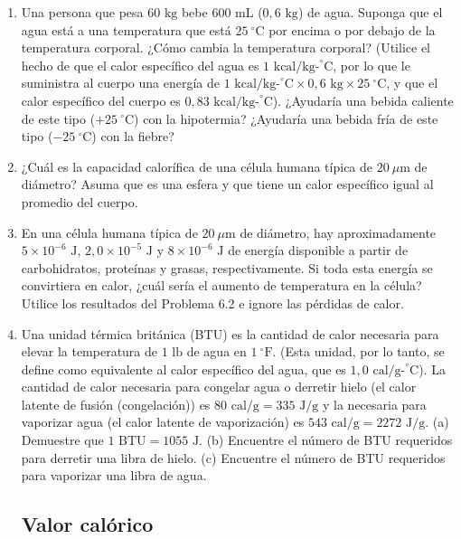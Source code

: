 \documentclass[12pt]{book}
\begin{document}
\begin{enumerate}

\item[6.1] Una persona que pesa $60\text{ kg}$ bebe $600\text{ mL}$ ($0{,}6\text{ kg}$) de agua. Suponga que el agua está a una temperatura que está $25\ ^\circ\text{C}$ por encima o por debajo de la temperatura corporal. ¿Cómo cambia la temperatura corporal? (Utilice el hecho de que el calor específico del agua es $1\text{ kcal/kg-}^\circ\text{C}$, por lo que le suministra al cuerpo una energía de $1\text{ kcal/kg-}^\circ\text{C} \times 0{,}6\text{ kg} \times 25\ ^\circ\text{C}$, y que el calor específico del cuerpo es $0{,}83\text{ kcal/kg-}^\circ\text{C}$). ¿Ayudaría una bebida caliente de este tipo ($+25\ ^\circ\text{C}$) con la hipotermia? ¿Ayudaría una bebida fría de este tipo ($-25\ ^\circ\text{C}$) con la fiebre?

\item[6.2] ¿Cuál es la capacidad calorífica de una célula humana típica de $20\ \mu\text{m}$ de diámetro? Asuma que es una esfera y que tiene un calor específico igual al promedio del cuerpo.

\item[6.3] En una célula humana típica de $20\ \mu\text{m}$ de diámetro, hay aproximadamente $5 \times 10^{-6}\text{ J}$, $2{,}0 \times 10^{-5}\text{ J}$ y $8 \times 10^{-6}\text{ J}$ de energía disponible a partir de carbohidratos, proteínas y grasas, respectivamente. Si toda esta energía se convirtiera en calor, ¿cuál sería el aumento de temperatura en la célula? Utilice los resultados del Problema 6.2 e ignore las pérdidas de calor.

\item[6.4] Una unidad térmica británica (BTU) es la cantidad de calor necesaria para elevar la temperatura de $1\text{ lb}$ de agua en $1\ ^\circ\text{F}$. (Esta unidad, por lo tanto, se define como equivalente al calor específico del agua, que es $1{,}0\text{ cal/g-}^\circ\text{C}$). La cantidad de calor necesaria para congelar agua o derretir hielo (el calor latente de fusión (congelación)) es $80\text{ cal/g} = 335\text{ J/g}$ y la necesaria para vaporizar agua (el calor latente de vaporización) es $543\text{ cal/g} = 2272\text{ J/g}$. (a) Demuestre que $1\text{ BTU} = 1055\text{ J}$. (b) Encuentre el número de BTU requeridos para derretir una libra de hielo. (c) Encuentre el número de BTU requeridos para vaporizar una libra de agua.

\subsection*{Valor calórico}


\end{enumerate}
\end{document}
